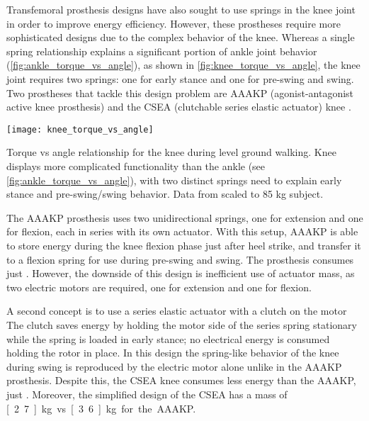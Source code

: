 Transfemoral prosthesis designs have also sought to use springs in the knee
joint in order to improve energy efficiency. However, these prostheses require
more sophisticated designs due to the complex behavior of the knee. Whereas a
single spring relationship explains a significant portion of ankle joint
behavior (\cref{fig:ankle_torque_vs_angle}), as shown in
\cref{fig:knee_torque_vs_angle}, the knee joint requires two springs: one for
early stance and one for pre-swing and swing. Two prostheses that tackle this
design problem are AAAKP (agonist-antagonist active knee prosthesis)
\citep{martinez2008design, martinez2011antagonistic} and the CSEA (clutchable
series elastic actuator) knee \citep{rouse2014clutchable, rouse2015design}.

\begin{marginfigure}[0.5in]
    \centering
    \texttt{[image: knee\_torque\_vs\_angle]}
    \caption{Torque vs angle relationship for the knee during level ground
    walking. Knee displays more complicated functionality than the ankle (see
    \cref{fig:ankle_torque_vs_angle}), with two distinct springs need to explain
    early stance and pre-swing/swing behavior. Data from
    \citet{winter2009biomechanics} scaled to 85 kg subject.}
    \label{fig:knee_torque_vs_angle}
\end{marginfigure}

The AAAKP prosthesis uses two unidirectional springs, one for extension and one
for flexion, each in series with its own actuator. With this setup,
AAAKP is able to store energy during the knee flexion phase just after heel
strike, and transfer it to a flexion spring for use during pre-swing and swing.
The prosthesis consumes just . However, the downside of
this design is inefficient use of actuator mass, as two electric motors are
required, one for extension and one for flexion.

A second concept is to use a series elastic actuator with a clutch on the motor
\citep{rouse2014clutchable, rouse2015design} The clutch saves energy by holding
the motor side of the series spring stationary while the spring is loaded in
early stance; no electrical energy is consumed holding the rotor in place. In
this design the spring-like behavior of the knee during swing is reproduced by
the electric motor alone unlike in the AAAKP prosthesis. Despite this, the
CSEA knee consumes less energy than the AAAKP, just .
Moreover, the simplified design of the CSEA has a mass of \unit[2.7]{kg} vs
\unit[3.6]{kg} for the AAAKP.

